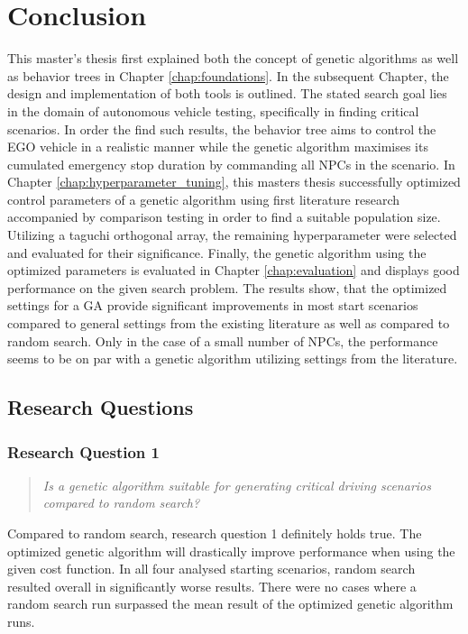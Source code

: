\chapter{Conclusion}
This master's thesis first explained both the concept of genetic algorithms as well as behavior trees in Chapter \ref{chap:foundations}. In the subsequent Chapter, the design and implementation of both tools is outlined. The stated search goal lies in the domain of autonomous vehicle testing, specifically in finding critical scenarios. In order the find such results, the behavior tree aims to control the EGO vehicle in a realistic manner while the genetic algorithm maximises its cumulated emergency stop duration by commanding all NPCs in the scenario. In Chapter \ref{chap:hyperparameter_tuning}, this masters thesis successfully optimized control parameters of a genetic algorithm using first literature research accompanied by comparison testing in order to find a suitable population size. Utilizing a taguchi orthogonal array, the remaining hyperparameter were selected and evaluated for their significance. Finally, the genetic algorithm using the optimized parameters is evaluated in Chapter \ref{chap:evaluation} and displays good performance on the given search problem. The results show, that the optimized settings for a GA provide significant improvements in most start scenarios compared to general settings from the existing literature as well as compared to random search. Only in the case of a small number of NPCs, the performance seems to be on par with a genetic algorithm utilizing settings from the literature.

\section{Research Questions}
\subsection{Research Question 1}
\begin{quote}
	\begin{em}
		\textit{Is a genetic algorithm suitable for generating critical driving scenarios compared to random search?}
	\end{em}
\end{quote}

Compared to random search, research question 1 definitely holds true. The optimized genetic algorithm will drastically improve performance when using the given cost function. In all four analysed starting scenarios, random search resulted overall in significantly worse results. There were no cases where a random search run surpassed the mean result of the optimized genetic algorithm runs.

